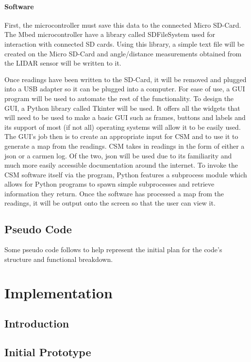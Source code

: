				\subsubsection{Software}
				First, the microcontroller must save this data to the connected Micro SD-Card. The Mbed microcontroller have a library called SDFileSystem used for interaction with connected SD cards. Using this library, a simple text file will be created on the Micro SD-Card and angle/distance measurements obtained from the LIDAR sensor will be written to it.
				
				Once readings have been written to the SD-Card, it will be removed and plugged into a USB adapter so it can be plugged into a computer. For ease of use, a GUI program will be used to automate the rest of the functionality. To design the GUI, a Python library called Tkinter will be used. It offers all the widgets that will need to be used to make a basic GUI such as frames, buttons and labels and its support of most (if not all) operating systems will allow it to be easily used. The GUI's job then is to create an appropriate input for CSM and to use it to generate a map from the readings. CSM takes in readings in the form of either a json or a carmen log. Of the two, json will be used due to its familiarity and much more easily accessible documentation around the internet. To invoke the CSM software itself via the program, Python features a subprocess module which allows for Python programs to spawn simple subprocesses and retrieve information they return. Once the software has processed a map from the readings, it will be output onto the screen so that the user can view it.
		
		\section{Pseudo Code}
		Some pseudo code follows to help represent the initial plan for the code's structure and functional breakdown.
		
	\chapter{Implementation}
		\section{Introduction}
		\section{Initial Prototype}
